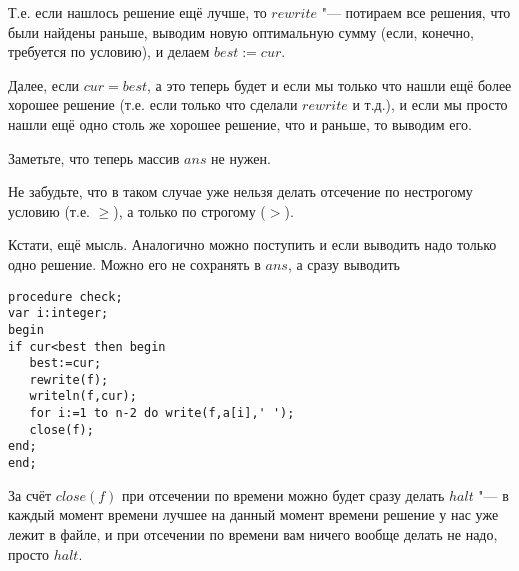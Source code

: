 Т.е. если нашлось решение ещё лучше, то $rewrite$ "--- потираем все решения, что 
были найдены раньше, выводим новую оптимальную сумму (если, конечно, 
требуется по условию), и делаем $best:=cur$. 

Далее, если $cur=best$, а это теперь будет и если мы только что нашли ещё более 
хорошее решение (т.е. если только что сделали $rewrite$ и т.д.), и если мы 
просто нашли ещё одно столь же хорошее решение, что и раньше, то выводим его.

Заметьте, что теперь массив $ans$ не нужен.

Не забудьте, что в таком случае уже нельзя делать отсечение по нестрогому 
условию (т.е. $\geq$), а только по строгому ($>$).

Кстати, ещё мысль. Аналогично можно поступить и если выводить надо 
только одно решение. Можно его не сохранять в $ans$, а сразу выводить

\begin{codesampleo}\begin{verbatim}
procedure check;
var i:integer;
begin
if cur<best then begin
   best:=cur;
   rewrite(f);
   writeln(f,cur);
   for i:=1 to n-2 do write(f,a[i],' ');
   close(f);
end;
end;
\end{verbatim}
\end{codesampleo}

За счёт $close(f)$ при отсечении по времени можно будет сразу делать $halt$ "--- в 
каждый момент времени лучшее на данный момент времени решение у нас уже лежит в 
файле, и при отсечении по времени вам ничего вообще делать не надо, просто $halt$.


